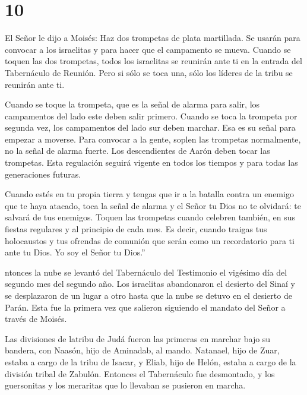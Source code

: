 \hypertarget{section-9}{%
\section{10}\label{section-9}}

 El Señor le dijo a Moisés:  Haz dos trompetas
de plata martillada. Se usarán para convocar a los israelitas y para
hacer que el campamento se mueva.  Cuando se toquen las dos
trompetas, todos los israelitas se reunirán ante ti en la entrada del
Tabernáculo de Reunión.  Pero si sólo se toca una, sólo los
líderes de la tribu se reunirán ante ti.

 Cuando se toque la trompeta, que es la señal de alarma para
salir, los campamentos del lado este deben salir primero. 
Cuando se toca la trompeta por segunda vez, los campamentos del lado sur
deben marchar. Esa es su señal para empezar a moverse.  Para
convocar a la gente, soplen las trompetas normalmente, no la señal de
alarma fuerte.  Los descendientes de Aarón deben tocar las
trompetas. Esta regulación seguirá vigente en todos los tiempos y para
todas las generaciones futuras.

 Cuando estés en tu propia tierra y tengas que ir a la
batalla contra un enemigo que te haya atacado, toca la señal de alarma y
el Señor tu Dios no te olvidará: te salvará de tus enemigos.
 Toquen las trompetas cuando celebren también, en sus
fiestas regulares y al principio de cada mes. Es decir, cuando traigas
tus holocaustos y tus ofrendas de comunión que serán como un
recordatorio para ti ante tu Dios. Yo soy el Señor tu Dios.''

 ntonces la nube se levantó del Tabernáculo del Testimonio
el vigésimo día del segundo mes del segundo año.  Los
israelitas abandonaron el desierto del Sinaí y se desplazaron de un
lugar a otro hasta que la nube se detuvo en el desierto de Parán.
 Esta fue la primera vez que salieron siguiendo el mandato
del Señor a través de Moisés.

 Las divisiones de latribu de Judá fueron las primeras en
marchar bajo su bandera, con Naasón, hijo de Aminadab, al mando.
 Natanael, hijo de Zuar, estaba a cargo de la tribu de
Isacar,  y Eliab, hijo de Helón, estaba a cargo de la
división tribal de Zabulón.  Entonces el Tabernáculo fue
desmontado, y los guersonitas y los meraritas que lo llevaban se
pusieron en marcha.

